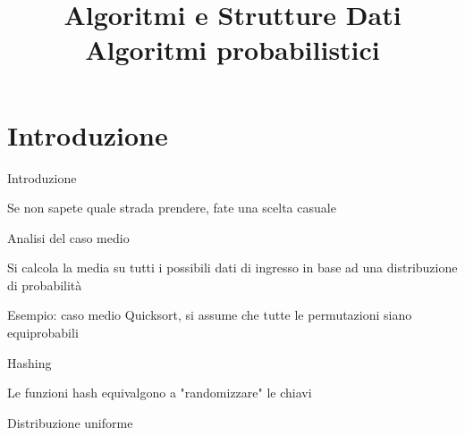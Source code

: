 
\title[ASD - Algoritmi probabilistici]{\textbf{Algoritmi e Strutture Dati}\\[24pt]Algoritmi probabilistici}

\usepackage[mode=buildnew]{standalone}
\usepackage{xcolor}
\usepackage{colortbl}
\usepackage{epigraph}
\usepackage{tikz}
\usepackage{xmpmulti}
\usepackage{listings}
\usepackage{xfrac}
\usepackage{cancel}


\newcommand{\R}[1]{\textcolor{red}{#1}}
\newcommand{\B}[1]{\textcolor{blue}{#1}}

\renewcommand{\arraystretch}{1.4}
\graphicspath{{figs/17/}}





\FrameTitle{}

\FrameContent



\section{Introduzione}

\begin{frame}{Introduzione}

\vspace{-9pt}
\BIL
\item Se non sapete quale strada prendere, fate una scelta casuale
\EIL

\BIL
\item Analisi del caso medio
  \BI
  \item Si calcola la media su tutti i possibili dati di ingresso
  in base ad una distribuzione di probabilità
  \item Esempio: caso medio Quicksort, si assume che tutte 
  le permutazioni siano equiprobabili
  \EI
\item Hashing
  \BI 
  \item Le funzioni hash equivalgono a "randomizzare" le chiavi
  \item Distribuzione uniforme
  \EI
\EIL

\end{frame}

